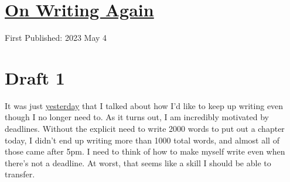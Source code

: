 \documentclass[12pt]{article}[titlepage]
\newcommand{\1}{\={a}}
\newcommand{\2}{\={e}}
\newcommand{\3}{\={\i}}
\newcommand{\4}{\=o}
\newcommand{\5}{\=u}
\newcommand{\6}{\={A}}
\renewcommand{\,}{\textsuperscript{,}}
\begin{document}
\doublespacing
\section{\href{writing-4.html}{On Writing Again}}
First Published: 2023 May 4

\section{Draft 1}
It was just \href{writathon-23-april.html}{yesterday} that I talked about how I'd like to keep up writing even though I no longer need to.
As it turns out, I am incredibly motivated by deadlines.
Without the explicit need to write 2000 words to put out a chapter today, I didn't end up writing more than 1000 total words, and almost all of those came after 5pm.
I need to think of how to make myself write even when there's not a deadline.
At worst, that seems like a skill I should be able to transfer.
\end{document}
